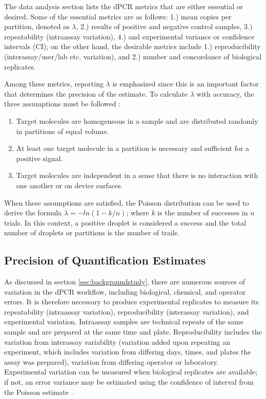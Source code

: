 The data analysis section lists the dPCR metrics that are either essential or desired. Some of the essential metrics are as follows: 1.) mean copies per partition, denoted as \(\lambda\), 2.) results of positive and negative control samples, 3.) repeatability (intraassay variation), 4.) and experimental variance or confidence intervals (CI); on the other hand, the desirable metrics include 1.) reproducibility (interassay/user/lab etc. variation), and 2.) number and concordance of biological replicates. 

Among these metrics, reporting \(\lambda\) is emphasized since this is an important factor that determines the precision of the estimate. To calculate \(\lambda\) with accuracy, the three assumptions must be followed \cite{Kreutz2011}:
\begin{enumerate}
    \item Target molecules are homogeneous in a sample and are distributed randomly in partitions of equal volume.
    \item At least one target molecule in a partition is necessary and sufficient for a positive signal.
    \item Target molecules are independent in a sense that there is no interaction with one another or on device surfaces.
\end{enumerate}

When these assumptions are satisfied, the Poisson distribution can be used to derive the formula \(\lambda = -ln(1-k/n)\); where \(k\) is the number of successes in \(n\) trials. In this context, a positive droplet is considered a success and the total number of droplets or partitions is the number of trails.


\subsection{Precision of Quantification Estimates}
\label{sec:ch2_perfeval_essentialMetrics}
As discussed in section \ref{sec:backgroundstudy}, there are numerous sources of variation in the dPCR workflow, including biological, chemical, and operator errors. It is therefore necessary to produce experimental replicates to measure its repeatability (intraassay variation), reproducibility (interassay variation), and experimental variation. Intraassay samples are technical repeats of the same sample and are prepared at the same time and plate. Reproducibility includes the variation from interassay variability (variation added upon repeating an experiment, which includes variation from differing days, times, and plates the assay was prepared), variation from differing operator or laboratory. Experimental variation can be measured when biological replicates are available; if not, an error variance may be estimated using the confidence of interval from the Poisson estimate \cite{Huggett2013_MIQEGuidelines}.

